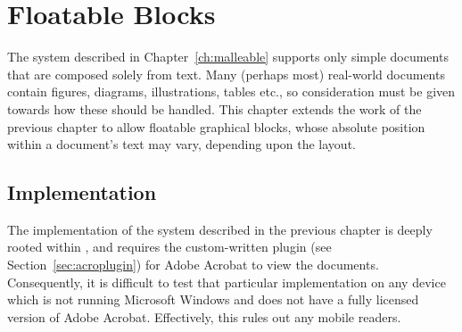 \cleardoublepage
\chapter{Floatable Blocks}\label{ch:floats}

% 

The system described in Chapter~\ref{ch:malleable} supports only simple documents that are composed solely from text. Many (perhaps most) real-world documents contain figures, diagrams, illustrations, tables etc., so consideration must be given towards how these should be handled.
This chapter extends the work of the previous chapter to allow floatable graphical blocks, whose absolute position within a document's text may vary, depending upon the layout.

\section{Implementation}

The implementation of the system described in the previous chapter is deeply rooted within \pdf{}, and requires the custom-written plugin (see Section~\ref{sec:acroplugin}) for Adobe Acrobat to view the documents. Consequently, it is difficult to test that particular implementation on any device which is not running Microsoft Windows and does not have a fully licensed version of Adobe Acrobat. Effectively, this rules out any mobile \ebook{} readers.

